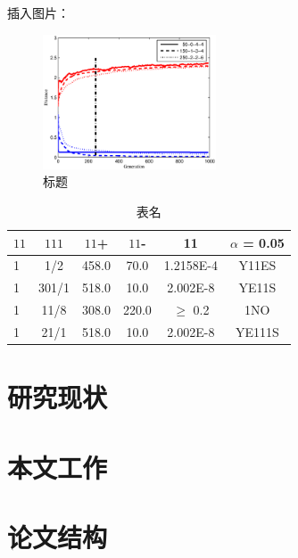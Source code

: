 插入图片：

\begin{figure}[ht]
\centering
\includegraphics[height=4cm]{figures/parameter.eps}
\caption{标题}
\label{labeliiiiii}
\end{figure}


\begin{table}
\centering
\caption{表名}
\label{tab:1}
\begin{tabular}{l|c|c|c|c|c}
\hline
$11$    & $111$      & $11$+         & $11$-         & 11    & $\alpha$ = 0.05   \\
\hline
1 & 1/2& 458.0 & 70.0 & 1.2158E-4 & Y11ES \\ \hline
1& 301/1& 518.0 & 10.0 & 2.002E-8 & YE11S \\ \hline
1 & 11/8& 308.0 & 220.0 & $\geq$ 0.2 & 1NO \\ \hline
1 & 21/1& 518.0 & 10.0 & 2.002E-8 & YE111S \\ \hline
\hline

\end{tabular}%
\end{table}


\section{研究现状}

\section{本文工作}

\section{论文结构}

